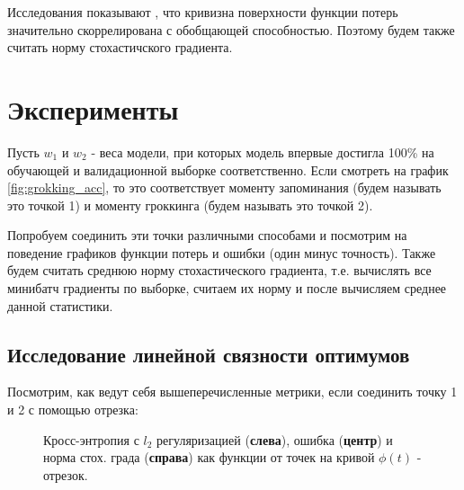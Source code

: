 \documentclass{article} %
\begin{document}
Исследования показывают \cite{keskar2017largebatch}, что кривизна поверхности функции потерь значительно скоррелирована с обобщающей способностью. Поэтому будем также считать норму стохастичского градиента.
\section{Эксперименты}
Пусть $w_1$ и $w_2$ - веса модели, при которых модель впервые достигла 100\% на обучающей и валидационной выборке соответственно. Если смотреть на график \ref{fig:grokking_acc}, то это соответствует моменту запоминания (будем называть  это точкой 1) и моменту гроккинга (будем называть это точкой 2).

Попробуем соединить эти точки различными способами и посмотрим на поведение графиков функции потерь и ошибки (один минус точность). Также будем считать среднюю норму стохастического градиента, т.е. вычислять все минибатч градиенты по выборке, считаем их норму и после вычисляем среднее данной статистики.
\newpage
\subsection{Исследование линейной связности оптимумов}
Посмотрим, как ведут себя вышеперечисленные метрики, если соединить точку 1 и 2 с помощью отрезка:
\begin{figure}[!ht]
    \centering
    \caption{Кросс-энтропия с $l_2$ регуляризацией (\textbf{слева}), ошибка (\textbf{центр}) и норма стох. града (\textbf{справа}) как функции от точек на кривой $\phi(t)$ - отрезок.}
    \label{fig:segment}
\end{figure}
\end{document}
